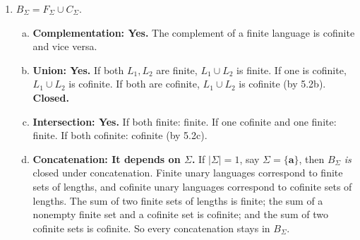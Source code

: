 \begin{enumerate}[{5.}1. ]
\begin{enumerate}[(a)]
  \item \textbf{Intersection: Yes.}  $L_1\cap L_2=\Sigma^*\setminus(F_1\cup F_2)$.  Since $F_1$ and $F_2$ are finite, so is $F_1\cup F_2$, hence $L_1\cap L_2\in C_\Sigma$.

  \item \textbf{Concatenation: Yes.}  If $L_1,L_2\in C_\Sigma$, then there exists $N_1$ such that all words of length $\ge N_1$ are in $L_1$, and there exists $N_2$ such that all words of length $\ge N_2$ are in $L_2$.  Then any word of length $\ge N_1+N_2$ can be split so that both parts are in $L_1$ and $L_2$, so $L_1\cdot L_2$ is cofinite.

  \item \textbf{Kleene closure: Yes.}  Since $L$ is cofinite, there is an $N$
  such that every word of length at least $N$ lies in $L$.  Hence every word of
  length at least $N$ also lies in $L^*$ (just take it as a one-factor product).
  Therefore $\Sigma^*\setminus L^*$ contains only words of length $<N$, so it is
  finite and $L^*\in C_\Sigma$.

  \item \textbf{Relative complement: No.}  $L_1\setminus L_2=L_1\cap\sim L_2$.  Here $\sim L_2$ is finite, so $L_1\setminus L_2\subseteq\sim L_2$ is finite, not cofinite in general.  Counterexample: $L_1=\Sigma^*\setminus\emptyset=\Sigma^*$ and $L_2=\Sigma^*\setminus\{\pmb{a}\}$.  Then $L_1\setminus L_2=\{\pmb{a}\}$, which is finite, not cofinite.
\end{enumerate}

\item $B_\Sigma=F_\Sigma\cup C_\Sigma$.

\begin{enumerate}[(a)]
  \item \textbf{Complementation: Yes.}  The complement of a finite language is cofinite and vice versa.
  \item \textbf{Union: Yes.}  If both $L_1,L_2$ are finite, $L_1\cup L_2$ is finite.  If one is cofinite, $L_1\cup L_2$ is cofinite.  If both are cofinite, $L_1\cup L_2$ is cofinite (by 5.2b).  \textbf{Closed.}
  \item \textbf{Intersection: Yes.}  If both finite: finite.  If one cofinite and one finite: finite.  If both cofinite: cofinite (by 5.2c).
  \item \textbf{Concatenation: It depends on $\Sigma$.}
  If $|\Sigma|=1$, say $\Sigma=\{\pmb{a}\}$, then $B_\Sigma$ \emph{is} closed
  under concatenation.  Finite unary languages correspond to finite sets of
  lengths, and cofinite unary languages correspond to cofinite sets of lengths.
  The sum of two finite sets of lengths is finite; the sum of a nonempty finite
  set and a cofinite set is cofinite; and the sum of two cofinite sets is
  cofinite.  So every concatenation stays in $B_\Sigma$.


\end{enumerate}
\end{enumerate}
